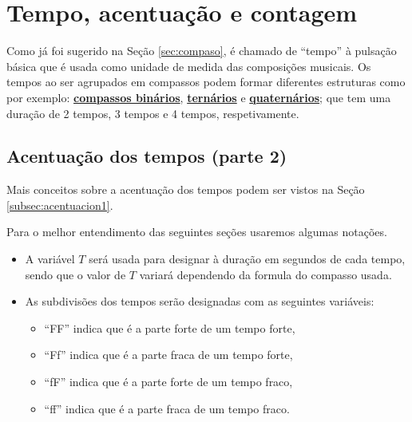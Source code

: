 \section{Tempo, acentuação e contagem}
\label{sec:Tempo}

Como já foi sugerido na Seção \ref{sec:compaso}, é chamado de ``tempo''
à pulsação básica que é usada como unidade de medida das composições musicais.
Os tempos ao ser agrupados em compassos podem formar diferentes estruturas como por exemplo: 
\hyperref[subsec:compassobinario]{\textbf{compassos binários}}, 
\hyperref[subsec:compassoternario]{\textbf{ternários}} e 
\hyperref[subsec:compassoquaternario]{\textbf{quaternários}}; que tem uma duração de 2 tempos, 
3 tempos e 4 tempos, respetivamente. 



\subsection{Acentuação dos tempos (parte 2)}
\label{subsec:acentuacion2}


Mais conceitos sobre a acentuação dos tempos podem ser vistos na Seção \ref{subsec:acentuacion1}.

\begin{notation} Para o melhor entendimento das seguintes seções usaremos algumas notações.
\begin{itemize}
\item A variável $T$ será usada para designar à duração em segundos de cada tempo,
sendo que o valor de $T$ variará dependendo da formula do compasso usada.

\item As subdivisões dos tempos serão designadas com as seguintes variáveis:
\begin{itemize}
\item ``FF'' indica que é a parte forte de um tempo forte,
\item ``Ff'' indica que é a parte fraca de um tempo forte,
\item ``fF'' indica que é a parte forte de um tempo fraco,
\item ``ff'' indica que é a parte fraca de um tempo fraco.
\end{itemize}
\end{itemize}
 
\end{notation}

